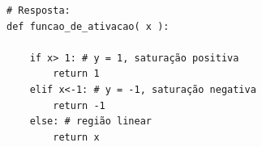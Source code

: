 \ifmostrarGabarito
\begin{verbatim}
# Resposta:
def funcao_de_ativacao( x ):

    if x> 1: # y = 1, saturação positiva
        return 1
    elif x<-1: # y = -1, saturação negativa
        return -1
    else: # região linear
        return x
\end{verbatim}
\fi
